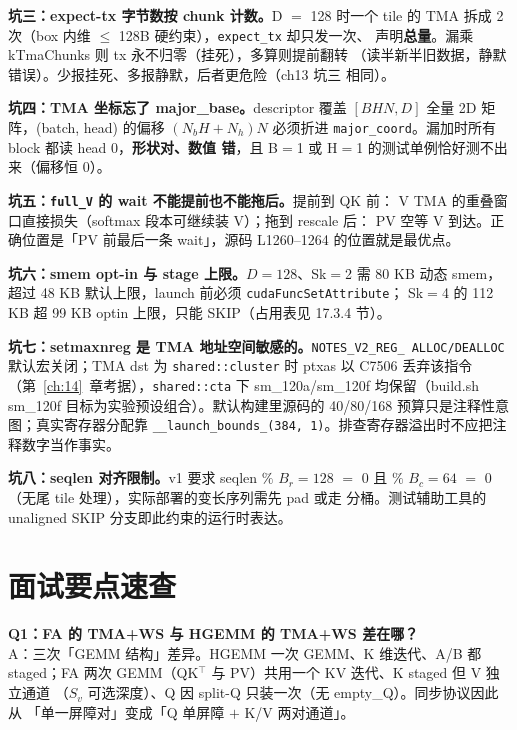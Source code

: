 \textbf{坑三：expect-tx 字节数按 chunk 计数。}\allowbreak{}D $=$ 128 时一个 tile 的 TMA
拆成 2 次（box 内维 $\le$ 128B 硬约束），\texttt{expect\_tx} 却只发一次、
声明\textbf{总量}。漏乘 kTmaChunks 则 tx 永不归零（挂死），多算则提前翻转
（读半新半旧数据，静默错误）。少报挂死、多报静默，后者更危险（ch13 坑三
相同）。

\textbf{坑四：TMA 坐标忘了 major\_base。}\allowbreak{}descriptor 覆盖 $[BHN, D]$ 全量
2D 矩阵，(batch, head) 的偏移 $(N_b H + N_h) N$ 必须折进
\texttt{major\_coord}。漏加时所有 block 都读 head 0，\textbf{形状对、数值
错}，且 B$=$1 或 H$=$1 的测试单例恰好测不出来（偏移恒 0）。

\textbf{坑五：\texttt{full\_V} 的 wait 不能提前也不能拖后。}提前到 QK 前：
V TMA 的重叠窗口直接损失（softmax 段本可继续装 V）；拖到 rescale 后：
PV 空等 V 到达。正确位置是「PV 前最后一条 wait」，源码 L1260--1264
的位置就是最优点。

\textbf{坑六：smem opt-in 与 stage 上限。}$D{=}128$、Sk$=$2 需 80 KB 动态
smem，超过 48 KB 默认上限，launch 前必须 \texttt{cuda\allowbreak{}Func\allowbreak{}Set\allowbreak{}Attribute}；
Sk$=$4 的 112 KB 超 99 KB optin 上限，只能 SKIP（占用表见 17.3.4 节）。

\textbf{坑七：setmaxnreg 是 TMA 地址空间敏感的。}\texttt{NOTES\_\allowbreak{}V2\_\allowbreak{}REG\_\allowbreak{}
ALLOC/\allowbreak{}DEALLOC} 默认宏关闭；TMA dst 为 \texttt{shared::cluster} 时 ptxas 以 C7506
丢弃该指令（第~\ref{ch:14}~章考据），\texttt{shared::cta} 下 sm\_120a/sm\_120f
均保留（build.sh sm\_120f 目标为实验预设组合）。默认构建里源码的
40/80/168 预算只是注释性意图；真实寄存器分配靠
\texttt{\_\allowbreak{}\_\allowbreak{}launch\_\allowbreak{}bounds\_\allowbreak{}(384,\allowbreak{} 1)}。排查寄存器溢出时不应把注释数字当作事实。

\textbf{坑八：seqlen 对齐限制。}\allowbreak{}v1 要求 seqlen $\%$ $B_r{=}128$ $=$ 0 且
$\%$ $B_c{=}64$ $=$ 0（无尾 tile 处理），实际部署的变长序列需先 pad 或走
分桶。测试辅助工具的 unaligned SKIP 分支即此约束的运行时表达。

\section{面试要点速查}

\textbf{Q1：FA 的 TMA+WS 与 HGEMM 的 TMA+WS 差在哪？}\\
A：三次「GEMM 结构」差异。HGEMM 一次 GEMM、K 维迭代、A/B 都 staged；FA
两次 GEMM（QK$^\top$ 与 PV）共用一个 KV 迭代、K staged 但 V 独立通道
（$S_v$ 可选深度）、Q 因 split-Q 只装一次（无 empty\_Q）。同步协议因此从
「单一屏障对」变成「Q 单屏障 $+$ K/V 两对通道」。

